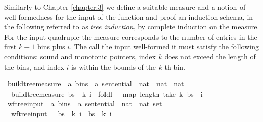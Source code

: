 \begin{isabellebody}
\begin{isamarkuptext}%
Similarly to Chapter \ref{chapter:3} we define a suitable measure and a notion of well-formedness
for the input of the function  and proof an induction schema, in
the following referred to as \textit{tree induction}, by complete induction on the measure.
For the input quadruple  the measure corresponds to the number of entries
in the first $k-1$ bins plus $i$. The call the input well-formed it must satisfy the following
conditions: sound and monotonic pointers, index $k$ does not exceed the length of the bins, and
index $i$ is within the bounds of the $k$-th bin.%
\end{isamarkuptext}\isamarkuptrue%
\isamarkupfalse%
\ build{\isacharunderscore}{\kern0pt}tree{\isacharprime}{\kern0pt}{\isacharunderscore}{\kern0pt}measure\ {\isacharcolon}{\kern0pt}{\isacharcolon}{\kern0pt}\ {\isachardoublequoteopen}{\isacharparenleft}{\kern0pt}{\isacharprime}{\kern0pt}a\ bins\ {\isasymtimes}\ {\isacharprime}{\kern0pt}a\ sentential\ {\isasymtimes}\ nat\ {\isasymtimes}\ nat{\isacharparenright}{\kern0pt}\ {\isasymRightarrow}\ nat{\isachardoublequoteclose}\ \isanewline
\ \ {\isachardoublequoteopen}build{\isacharunderscore}{\kern0pt}tree{\isacharprime}{\kern0pt}{\isacharunderscore}{\kern0pt}measure\ {\isacharparenleft}{\kern0pt}bs{\isacharcomma}{\kern0pt}\ {\isasymomega}{\isacharcomma}{\kern0pt}\ k{\isacharcomma}{\kern0pt}\ i{\isacharparenright}{\kern0pt}\ {\isacharequal}{\kern0pt}\ foldl\ {\isacharparenleft}{\kern0pt}{\isacharplus}{\kern0pt}{\isacharparenright}{\kern0pt}\ {}\ {\isacharparenleft}{\kern0pt}map\ length\ {\isacharparenleft}{\kern0pt}take\ k\ bs{\isacharparenright}{\kern0pt}{\isacharparenright}{\kern0pt}\ {\isacharplus}{\kern0pt}\ i{\isachardoublequoteclose}\isanewline
\isanewline
{}\isamarkupfalse%
\ wf{\isacharunderscore}{\kern0pt}tree{\isacharunderscore}{\kern0pt}input\ {\isacharcolon}{\kern0pt}{\isacharcolon}{\kern0pt}\ {\isachardoublequoteopen}{\isacharparenleft}{\kern0pt}{\isacharprime}{\kern0pt}a\ bins\ {\isasymtimes}\ {\isacharprime}{\kern0pt}a\ sentential\ {\isasymtimes}\ nat\ {\isasymtimes}\ nat{\isacharparenright}{\kern0pt}\ set{\isachardoublequoteclose}\ \isanewline
\ \ {\isachardoublequoteopen}wf{\isacharunderscore}{\kern0pt}tree{\isacharunderscore}{\kern0pt}input\ {\isacharequal}{\kern0pt}\ {\isacharbraceleft}{\kern0pt}\ {\isacharparenleft}{\kern0pt}bs{\isacharcomma}{\kern0pt}\ {\isasymomega}{\isacharcomma}{\kern0pt}\ k{\isacharcomma}{\kern0pt}\ i{\isacharparenright}{\kern0pt}\ {\isacharbar}{\kern0pt}\ bs\ {\isasymomega}\ k\ i{\isachardot}{\kern0pt}\isanewline

\end{isabellebody}
